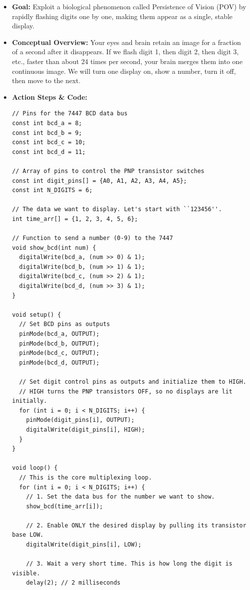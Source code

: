 \documentclass[11pt,a4paper]{article}
\begin{document}
\begin{itemize}
    \item \textbf{Goal:} Exploit a biological phenomenon called Persistence of Vision (POV) by rapidly flashing digits one by one, making them appear as a single, stable display.
    \item \textbf{Conceptual Overview:} Your eyes and brain retain an image for a fraction of a second after it disappears. If we flash digit 1, then digit 2, then digit 3, etc., faster than about 24 times per second, your brain merges them into one continuous image. We will turn one display on, show a number, turn it off, then move to the next.
    \item \textbf{Action Steps \& Code:}
\begin{lstlisting}[caption={Code for Module 3.2: Software Multiplexing}]
// Pins for the 7447 BCD data bus
const int bcd_a = 8;
const int bcd_b = 9;
const int bcd_c = 10;
const int bcd_d = 11;

// Array of pins to control the PNP transistor switches
const int digit_pins[] = {A0, A1, A2, A3, A4, A5};
const int N_DIGITS = 6;

// The data we want to display. Let's start with ``123456''.
int time_arr[] = {1, 2, 3, 4, 5, 6};

// Function to send a number (0-9) to the 7447
void show_bcd(int num) {
  digitalWrite(bcd_a, (num >> 0) & 1);
  digitalWrite(bcd_b, (num >> 1) & 1);
  digitalWrite(bcd_c, (num >> 2) & 1);
  digitalWrite(bcd_d, (num >> 3) & 1);
}

void setup() {
  // Set BCD pins as outputs
  pinMode(bcd_a, OUTPUT);
  pinMode(bcd_b, OUTPUT);
  pinMode(bcd_c, OUTPUT);
  pinMode(bcd_d, OUTPUT);

  // Set digit control pins as outputs and initialize them to HIGH.
  // HIGH turns the PNP transistors OFF, so no displays are lit initially.
  for (int i = 0; i < N_DIGITS; i++) {
    pinMode(digit_pins[i], OUTPUT);
    digitalWrite(digit_pins[i], HIGH);
  }
}

void loop() {
  // This is the core multiplexing loop.
  for (int i = 0; i < N_DIGITS; i++) {
    // 1. Set the data bus for the number we want to show.
    show_bcd(time_arr[i]);
    
    // 2. Enable ONLY the desired display by pulling its transistor base LOW.
    digitalWrite(digit_pins[i], LOW);
    
    // 3. Wait a very short time. This is how long the digit is visible.
    delay(2); // 2 milliseconds
    

\end{lstlisting}
\end{itemize}
\end{document}
